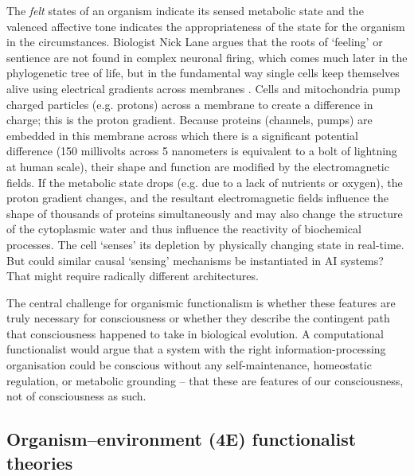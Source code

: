 \documentclass[11pt, a4paper, onecolumn, gdm]{google}
\begin{document}
The \emph{felt} states of an organism indicate its sensed metabolic state and the valenced affective tone indicates the appropriateness of the state for the organism in the circumstances.
Biologist Nick Lane argues that the roots of `feeling' or sentience are not found in complex neuronal firing, which comes much later in the phylogenetic tree of life, but in the fundamental way single cells keep themselves alive using electrical gradients across membranes \citep{lane2022}.
Cells and mitochondria pump charged particles (e.g. protons) across a membrane to create a difference in charge; this is the proton gradient.
Because proteins (channels, pumps) are embedded in this membrane across which there is a significant potential difference (150 millivolts across 5 nanometers is equivalent to a bolt of lightning at human scale), their shape and function are modified by the electromagnetic fields.
If the metabolic state drops (e.g. due to a lack of nutrients or oxygen), the proton gradient changes, and the resultant electromagnetic fields influence the shape of thousands of proteins simultaneously and may also change the structure of the cytoplasmic water and thus influence the reactivity of biochemical processes.
The cell `senses' its depletion by physically changing state in real-time.
But could similar causal `sensing' mechanisms be instantiated in AI systems?
That might require radically different architectures.

The central challenge for organismic functionalism is whether these features are truly necessary for consciousness or whether they describe the contingent path that consciousness happened to take in biological evolution.
A computational functionalist would argue that a system with the right information-processing organisation could be conscious without any self-maintenance, homeostatic regulation, or metabolic grounding -- that these are features of our consciousness, not of consciousness as such.

\subsection{Organism--environment (4E) functionalist theories}\label{organismenvironment-4e-functionalist-theories}
\end{document}
